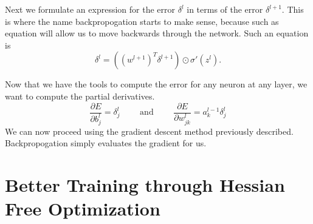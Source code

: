 \documentclass[]{article}
\newcommand{\abs}[1]{\left|#1\right|}
\newcommand{\B}[1]{\boldsymbol{#1}}
\newcommand{\pd}{\partial}
\newcommand{\tab}{\hspace*{.25in}}
\newcommand{\Hline}{\noindent\rule[0.5ex]{\linewidth}{.5pt}}
\theoremstyle{plain}
\theoremstyle{definition}
\newcommand{\algostart}[1]{\Hline\\\textbf{#1}\\\Hline\\}
\begin{document}
Next we formulate an expression for the error $ \delta^l $ in terms of the error $ \delta^{l+1} $. This is where the name backpropogation starts to make sense, because such as equation will allow us to move backwards through the network. Such an equation is
\[ \delta^l = ((w^{l+1})^T \delta^{l+1})\odot\sigma'(z^l). \]

Now that we have the tools to compute the error for any neuron at any layer, we want to compute the partial derivatives.
\[ \frac{\pd E}{\pd b_j^l} = \delta_j^l \qquad \text{ and }\qquad \frac{\pd E}{\pd w_{jk}^l} = a_k^{l-1}\delta_j^l \]
We can now proceed using the gradient descent method previously described. Backpropogation simply evaluates the gradient for us. 





\section{Better Training through Hessian Free Optimization}
\end{document}
